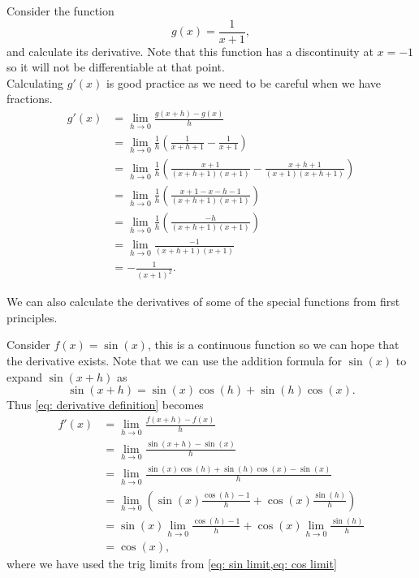 \begin{ex}
Consider the function 
\begin{equation*}
g(x)=\frac{1}{x+1},
\end{equation*}
and calculate its derivative. Note that this function has a discontinuity at $x=-1$ so it will not be differentiable at that point.\\

Calculating $g'(x)$ is good practice as we need to be careful when we have fractions.
\begin{align*}
g'(x)	&=\lim_{h\to 0}\frac{g(x+h)-g(x)}{h}\\
	&=\lim_{h\to 0}\frac{1}{h}\left(\frac{1}{x+h+1}-\frac{1}{x+1}\right)\\
	&=\lim_{h\to 0}\frac{1}{h}\left(\frac{x+1}{(x+h+1)(x+1)}-\frac{x+h+1}{(x+1)(x+h+1)}\right)\\
	&=\lim_{h\to 0}\frac{1}{h}\left(\frac{x+1-x-h-1}{(x+h+1)(x+1)}\right)\\
	&=\lim_{h\to 0}\frac{1}{h}\left(\frac{-h}{(x+h+1)(x+1)}\right)\\
	&=\lim_{h\to 0}\frac{-1}{(x+h+1)(x+1)}\\
	&=-\frac{1}{(x+1)^{2}}.
\end{align*}
\end{ex}

We can also calculate the derivatives of some of the special functions from first principles.
\begin{ex}
Consider $f(x)=\sin(x)$, this is a continuous function so we can hope that the derivative exists. Note that we can use the addition formula for $\sin(x)$ to expand $\sin(x+h)$ as
\begin{equation*}
\sin(x+h)=\sin(x)\cos(h)+\sin(h)\cos(x).
\end{equation*}
Thus \cref{eq: derivative definition} becomes
\begin{align*}
f'(x)	&=\lim_{h\to 0}\frac{f(x+h)-f(x)}{h}\\
	&=\lim_{h\to 0}\frac{\sin(x+h)-\sin(x)}{h}\\
	&=\lim_{h\to 0}\frac{\sin(x)\cos(h)+\sin(h)\cos(x)-\sin(x)}{h}\\
	&=\lim_{h\to 0}\left(\sin(x)\frac{\cos(h)-1}{h}+\cos(x)\frac{\sin(h)}{h}\right)\\
	&=\sin(x)\lim_{h\to 0}\frac{\cos(h)-1}{h}+\cos(x)\lim_{h\to 0}\frac{\sin(h)}{h}\\
	&=\cos(x),
\end{align*}
where we have used the trig limits from \cref{eq: sin limit,eq: cos limit}
\end{ex}

